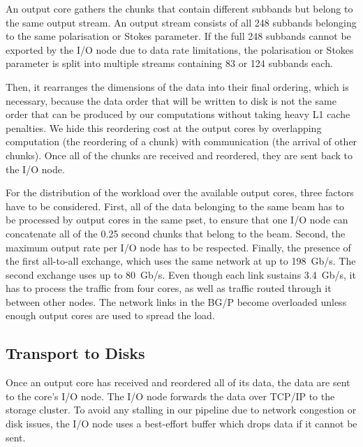 \documentclass{llncs}
\begin{document}
An output core gathers the chunks that contain different subbands but belong to the same output stream. An output stream consists of all 248 subbands belonging to the same polarisation or Stokes parameter. If the full 248 subbands cannot be exported by the I/O node due to data rate limitations, the polarisation or Stokes parameter is split into multiple streams containing 83 or 124 subbands each.

Then, it rearranges the dimensions of the data into their final ordering, which is necessary, because the data order that will be written to disk is not the same order that can be produced by our computations without taking heavy L1 cache penalties. We hide this reordering cost at the output cores by overlapping computation (the reordering of a chunk) with communication (the arrival of other chunks). Once all of the chunks are received and reordered, they are sent back to the I/O node.

For the distribution of the workload over the available output cores, three factors have to be considered. First, all of the data belonging to the same beam has to be processed by output cores in the same pset, to ensure that one I/O node can concatenate all of the 0.25 second chunks that belong to the beam. Second, the maximum output rate per I/O node has to be respected. Finally, the presence of the first all-to-all exchange, which uses the same network at up to 198~Gb/s. The second exchange uses up to 80~Gb/s. Even though each link sustains 3.4~Gb/s, it has to process the traffic from four cores, as well as traffic routed through it between other nodes. The network links in the BG/P become overloaded unless enough output cores are used to spread the load.

\subsection{Transport to Disks}
Once an output core has received and reordered all of its data, the data are sent to the core's I/O node. The I/O node forwards the data over TCP/IP to the storage cluster. To avoid any stalling in our pipeline due to network congestion or disk issues, the I/O node uses a best-effort buffer which drops data if it cannot be sent.

\end{document}
